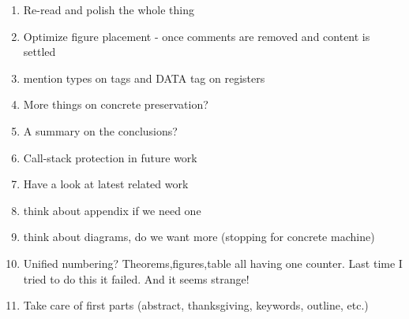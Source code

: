 \begin{enumerate}
\item Re-read and polish the whole thing
\item Optimize figure placement - once comments are removed and content is settled
\item mention types on tags and DATA tag on registers
\item More things on concrete preservation?
\item A summary on the conclusions?
\item Call-stack protection in future work
\item Have a look at latest related work
\item think about appendix if we need one
\item think about diagrams, do we want more (\EG stopping for concrete machine)
\item Unified numbering? Theorems,figures,table all having one counter. Last time
  I tried to do this it failed. And it seems strange!
\item Take care of first parts (abstract, thanksgiving, keywords, outline, etc.)
\end{enumerate}